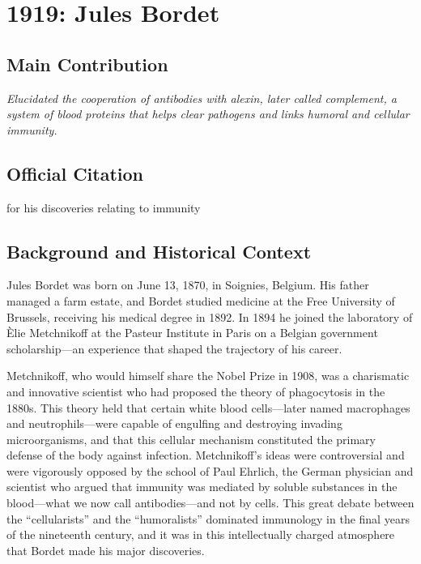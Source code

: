 \chapter[1919 --- Bordet]{1919: Jules Bordet}
\label{ch:1919_julesbordet}

\section*{Main Contribution}

\textit{Elucidated the cooperation of antibodies with alexin, later called complement, a system of blood proteins that helps clear pathogens and links humoral and cellular immunity.}\cite{nobel-1919,lecture-1919}

\section{Official Citation}

for his discoveries relating to immunity

\section{Background and Historical Context}

Jules Bordet was born on June 13, 1870, in Soignies, Belgium. His father managed a farm estate, and Bordet studied medicine at the Free University of Brussels, receiving his medical degree in 1892. In 1894 he joined the laboratory of \`Elie Metchnikoff at the Pasteur Institute in Paris on a Belgian government scholarship---an experience that shaped the trajectory of his career.\cite{bordet-biographical}

Metchnikoff, who would himself share the Nobel Prize in 1908, was a charismatic and innovative scientist who had proposed the theory of phagocytosis in the 1880s. This theory held that certain white blood cells---later named macrophages and neutrophils---were capable of engulfing and destroying invading microorganisms, and that this cellular mechanism constituted the primary defense of the body against infection. Metchnikoff's ideas were controversial and were vigorously opposed by the school of Paul Ehrlich, the German physician and scientist who argued that immunity was mediated by soluble substances in the blood---what we now call antibodies---and not by cells. This great debate between the ``cellularists'' and the ``humoralists'' dominated immunology in the final years of the nineteenth century, and it was in this intellectually charged atmosphere that Bordet made his major discoveries.

